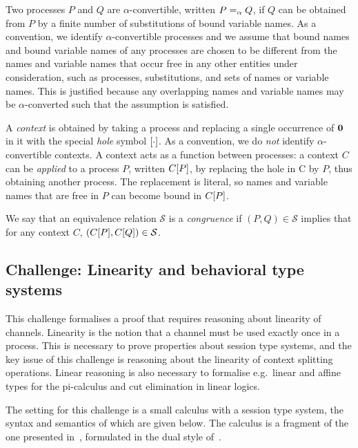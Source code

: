 \documentclass[runningheads]{llncs}
\begin{document}
Two processes \( P \) and \( Q \) are \( \alpha \)-convertible,
written \( P =_{\alpha} Q \), if \( Q \) can be obtained from \( P \)
by a finite number of substitutions of bound variable names.  As a
convention, we identify \( \alpha \)-convertible processes and we
assume that bound names and bound variable names of any processes are
chosen to be different from the names and variable names that occur
free in any other entities under consideration, such as processes,
substitutions, and sets of names or variable names.  This is justified
because any overlapping names and variable names may be
\( \alpha \)-converted such that the assumption is satisfied.


A \emph{context} is obtained by taking a process and replacing a single occurrence of \( \bm{0} \) in it with the special \emph{hole} symbol \( [\cdot] \).
As a convention, we do \emph{not} identify \( \alpha \)-convertible contexts.
%
A context acts as a function between processes:
a context \( C \) can be \emph{applied} to a process \( P \), written \( C[P] \), by replacing the hole in C by \( P \), thus obtaining another process.
The replacement is literal, so names and variable names that are free in \( P \) can become bound in \( C[P] \).

We say that an equivalence relation \( \mathcal{S} \) is a \emph{congruence} if \( (P,Q) \in \mathcal{S} \) implies that for any context \( C \), \( (C[P], C[Q]) \in \mathcal{S} \).

\subsection{Challenge: Linearity and behavioral type systems}
\label{sec:challenge:linearity-beh-types}
This challenge formalises a proof that requires reasoning about linearity of channels.
Linearity is the notion that a channel must be used exactly once in a process.
This is necessary to prove properties about session type systems, and the key
issue of this challenge is reasoning about the linearity of context splitting operations.
Linear reasoning is also necessary to formalise e.g.\ linear and affine types for the pi-calculus and cut elimination in linear logics.

The setting for this challenge is a small calculus with a session type
system, the syntax and semantics of which are given below. The
calculus is a fragment of the one presented in~\cite{Vasconcelos2012},
formulated in the dual style of~\cite{barber96tr}.
\end{document}

